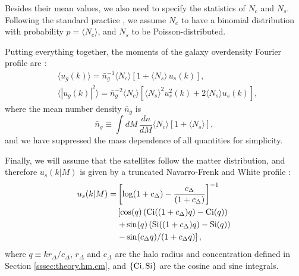 \documentclass[useAMS,usenatbib]{mn2e}
\begin{document}
      Besides their mean values, we also need to specify the statistics of $N_c$ and $N_s$. Following the standard practice \cite{2013MNRAS.430..725V}, we assume $N_c$ to have a binomial distribution with probability $p=\langle N_c\rangle$, and $N_s$ to be Poisson-distributed.

      Putting everything together, the moments of the galaxy overdensity Fourier profile are \cite{2013MNRAS.430..725V}:
      \begin{align}
        &\langle u_g(k)\rangle=\bar{n}_g^{-1}\langle N_c\rangle\left[1+\langle N_s\rangle\,u_s(k)\right],\\
        &\langle |u_g(k)|^2\rangle=\bar{n}_g^{-2}\langle N_c\rangle\left[\langle N_s\rangle^2u_s^2(k)+2\langle N_s\rangle u_s(k)\right],
      \end{align}
      where the mean number density $\bar{n}_g$ is
      \begin{equation}
        \bar{n}_g\equiv\int dM\,\frac{dn}{dM}\langle N_c\rangle\left[1+\langle N_s\rangle\right],
      \end{equation} 
      and we have suppressed the mass dependence of all quantities for simplicity.

      Finally, we will assume that the satellites follow the matter distribution, and therefore $u_s(k|M)$ is given by a truncated Navarro-Frenk and White profile \cite{1996ApJ...462..563N}:
      \begin{align}
        u_s(k|M)=&\left[\log(1+c_\Delta)-\frac{c_\Delta}{(1+c_\Delta)}\right]^{-1}\\
               &\left[\cos(q)\left({\rm Ci}((1+c_\Delta)q)-{\rm Ci}(q)\right)\right.\\\nonumber
               &\left.+\sin(q)\left({\rm Si}((1+c_\Delta)q)-{\rm Si}(q)\right)\right.\\&\left.-\sin(c_\Delta q)/(1+c_\Delta q)\right],
      \end{align}
      where $q\equiv kr_\Delta/c_\Delta$, $r_\Delta$ and $c_\Delta$ are the halo radius and concentration defined in Section \ref{sssec:theory.hm.cm}, and $\{{\rm Ci}, {\rm Si}\}$ are the cosine and sine integrals.
      
\end{document}
